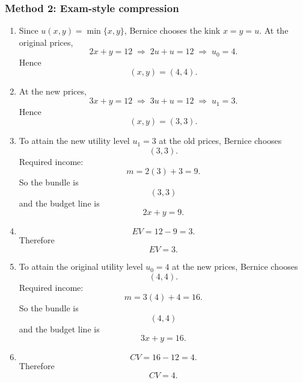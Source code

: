 \documentclass[12pt]{article}
\begin{document}
\newpage
\subsubsection{Method 2: Exam-style compression}
\begin{enumerate}[label=(\alph*)]
    \item
    Since \(u(x,y)=\min\{x,y\}\), Bernice chooses the kink \(x=y=u\). At the original prices,
    \[
    2x+y=12
    \;\Longrightarrow\;
    2u+u=12
    \;\Longrightarrow\;
    u_0=4.
    \]
    Hence
    \[
    \boxed{(x,y)=(4,4).}
    \]

    \item
    At the new prices,
    \[
    3x+y=12
    \;\Longrightarrow\;
    3u+u=12
    \;\Longrightarrow\;
    u_1=3.
    \]
    Hence
    \[
    \boxed{(x,y)=(3,3).}
    \]

    \item
    To attain the new utility level \(u_1=3\) at the old prices, Bernice chooses
    \[
    (3,3).
    \]
    Required income:
    \[
    m=2(3)+3=9.
    \]
    So the bundle is
    \[
    \boxed{(3,3)}
    \]
    and the budget line is
    \[
    \boxed{2x+y=9.}
    \]

    \item
    \[
    EV=12-9=3.
    \]
    Therefore
    \[
    \boxed{EV=3.}
    \]

    \item
    To attain the original utility level \(u_0=4\) at the new prices, Bernice chooses
    \[
    (4,4).
    \]
    Required income:
    \[
    m=3(4)+4=16.
    \]
    So the bundle is
    \[
    \boxed{(4,4)}
    \]
    and the budget line is
    \[
    \boxed{3x+y=16.}
    \]

    \item
    \[
    CV=16-12=4.
    \]
    Therefore
    \[
    \boxed{CV=4.}
    \]
\end{enumerate}

\newpage
\end{document}
